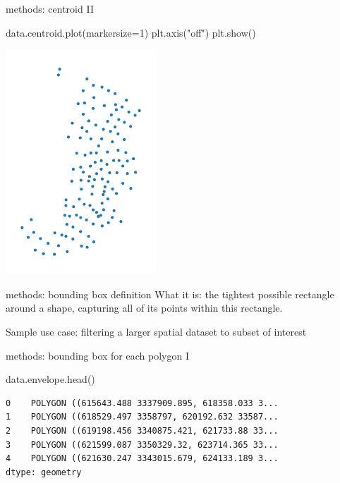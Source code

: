 \documentclass[
  ignorenonframetext,
]{beamer}
\newenvironment{Shaded}{\begin{snugshade}}{\end{snugshade}}
\newcommand{\DecValTok}[1]{\textcolor[rgb]{0.68,0.00,0.00}{#1}}
\newcommand{\NormalTok}[1]{\textcolor[rgb]{0.00,0.23,0.31}{#1}}
\newcommand{\OperatorTok}[1]{\textcolor[rgb]{0.37,0.37,0.37}{#1}}
\newcommand{\StringTok}[1]{\textcolor[rgb]{0.13,0.47,0.30}{#1}}
\begin{document}
\begin{frame}[fragile]{methods: centroid II}
\label{methods-centroid-ii}
\begin{Shaded}
\begin{Highlighting}[]
\NormalTok{data.centroid.plot(markersize}\OperatorTok{=}\DecValTok{1}\NormalTok{)}
\NormalTok{plt.axis(}\StringTok{"off"}\NormalTok{)}
\NormalTok{plt.show()}
\end{Highlighting}
\end{Shaded}

\includegraphics{spatial_2_files/figure-beamer/cell-18-output-1.pdf}
\end{frame}

\begin{frame}{methods: bounding box definition}
\label{methods-bounding-box-definition}
What it is: the tightest possible rectangle around a shape, capturing
all of its points within this rectangle.

Sample use case: filtering a larger spatial dataset to subset of
interest
\end{frame}

\begin{frame}[fragile]{methods: bounding box for each polygon I}
\label{methods-bounding-box-for-each-polygon-i}
\begin{Shaded}
\begin{Highlighting}[]
\NormalTok{data.envelope.head()}
\end{Highlighting}
\end{Shaded}

\begin{verbatim}
0    POLYGON ((615643.488 3337909.895, 618358.033 3...
1    POLYGON ((618529.497 3358797, 620192.632 33587...
2    POLYGON ((619198.456 3340875.421, 621733.88 33...
3    POLYGON ((621599.087 3350329.32, 623714.365 33...
4    POLYGON ((621630.247 3343015.679, 624133.189 3...
dtype: geometry
\end{verbatim}
\end{frame}
\end{document}
